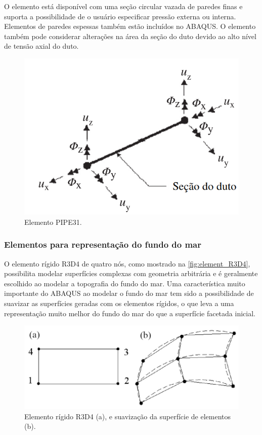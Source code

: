 O elemento está disponível com uma seção circular vazada de paredes finas e suporta a possibilidade de o usuário especificar pressão externa ou interna.
Elementos de paredes espessas também estão incluídos no ABAQUS\@.
O elemento também pode considerar alterações na área da seção do duto devido ao alto nível de tensão axial do duto.

\begin{figure}[!ht]
    \centering
    \caption{Elemento PIPE31.}\label{fig:elemen_PIPE31H}
    \includegraphics[width=0.5\linewidth]{imagens/elemen_PIPE31H}
\end{figure}


\subsubsection{Elementos para representação do fundo do mar}




O elemento rígido R3D4 de quatro nós, como mostrado na \autoref{fig:element_R3D4}, possibilita modelar superfícies complexas com geometria arbitrária e é geralmente escolhido ao modelar a topografia do fundo do mar. Uma característica muito importante do ABAQUS ao modelar o fundo do mar tem sido a possibilidade de suavizar as superfícies geradas com os elementos rígidos, o que leva a uma representação muito melhor do fundo do mar do que a superfície facetada inicial.

\begin{figure}[!ht]
    \centering
    \caption{Elemento rígido R3D4 (a), e suavização da superfície de elementos (b).}\label{fig:element_R3D4}
    \includegraphics[width=0.7\linewidth]{imagens/element_R3D4}
\end{figure}

